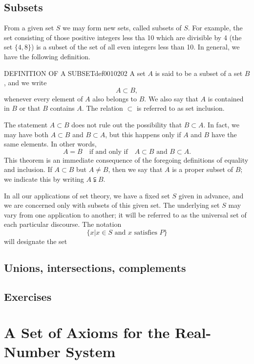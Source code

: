 \documentclass[cn,11pt,chinese]{elegantbook}
\numberwithin{equation}{section}
\begin{document}
\subsection{Subsets}
From a given set $S$ we may form new sets, called subsets of $S$. For example, the set consisting of those positive integers less tha 10 which are divisible by 4 (the set $\{4, 8\}$) is a subset of the set of all even integers less than 10. In general, we have the following definition.
\begin{definition}{DEFINITION OF A SUBSET}{def0010202}
A set $A$ is said to be a subset of a set $B$, and we write 
\[
A \subset B,
\]
whenever every element of $A$ also belongs to $B$. We also say that $A$ is contained in $B$ or that $B$ contains $A$. The relation $\subset$ is referred to as set inclusion.
\end{definition}

The statement $A \subset B$ does not rule out the possibility that $B \subset A$. In fact, we may have both $A \subset B$ and $B \subset A$, but this happens only if $A$ and $B$ have the same elements. In other words,
\[
A = B\quad \text{if and only if} \quad A \subset B \text{ and } B \subset A.
\]
This theorem is an immediate consequence of the foregoing definitions of equality and inclusion. If $A \subset B$ but $A \neq B$, then we say that $A$ is a proper subset of $B$; we indicate this by writing $A \subsetneqq B$.

In all our applications of set theory, we have a fixed set $S$ given in advance, and we are concerned only with subsets of this given set. The underlying set $S$ may vary from one application to another; it will be referred to as the universal set of each particular discourse. The notation 
\[
\{x | x \in S \text{ and } x \text{ satisfies } P\}
\]
will designate the set


\subsection{Unions, intersections, complements}



\subsection{Exercises}


\section{A Set of Axioms for the Real-Number System}\label{section00103}
\end{document}
